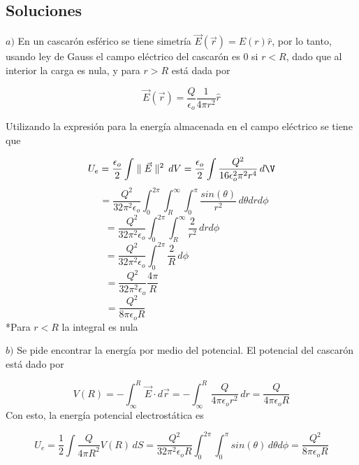 \subsection{Soluciones}

\newline\newline
$a)$ En un cascarón esférico se tiene simetría $\Vec{E}(\Vec{r}) = E(r)\hat{r}$, por lo tanto, usando ley de Gauss el campo eléctrico del cascarón es 0 si $r<R$, dado que al interior la carga es nula, y para $r>R$ está dada por

\[\Vec{E}(\Vec{r})=\frac{Q}{\epsilon_o}\frac{1}{4\pi r^2}\hat{r}\]

Utilizando la expresión para la energía almacenada en el campo eléctrico se tiene que

\[U_e = \frac{\epsilon_o}{2}\int \parallel\Vec{E}\parallel^2\, dV
= \frac{\epsilon_o}{2}\int \frac{Q^2}{16\epsilon_o^2\pi^2 r^4} \, d\V
\]
\[\,\,\,
= \frac{Q^2}{32\pi^2\epsilon_o}\int^{2\pi}_0\int^{\infty}_R\int^\pi_0 \frac{sin(\theta)}{r^2} \, d\theta drd\phi
\]
\[
= \frac{Q^2}{32\pi^2\epsilon_o}\int^{2\pi}_0\int^{\infty}_R \frac{2}{r^2} \, drd\phi
\,\,\,\,\,\,\,\,\,\,\,\,\,\,\,\,\,\,\,\,\,\,\,\,\]
\[
= \frac{Q^2}{32\pi^2\epsilon_o}\int^{2\pi}_0\frac{2}{R}\, d\phi
\,\,\,\,\,\,\,\,\,\,\,\,\,\,\,\,\,\,\,\,\,\,\,\,\,\,\,\,\,\,\,\,\,\,\,\,\,\,\,\,\,\,\,\]
\[
= \frac{Q^2}{32\pi^2\epsilon_o}\frac{4\pi}{R}
\,\,\,\,\,\,\,\,\,\,\,\,\,\,\,\,\,\,\,\,\,\,\,\,\,\,\,\,\,\,\,\,\,\,\,\,\,\,\,\,\,\,\,\,\,\,\,\,\,\,\,\,\,\,\,\,\,\,\,\,\,\]
\[
= \frac{Q^2}{8\pi\epsilon_oR}\,\,\,
\,\,\,\,\,\,\,\,\,\,\,\,\,\,\,\,\,\,\,\,\,\,\,\,\,\,\,\,\,\,\,\,\,\,\,\,\,\,\,\,\,\,\,\,\,\,\,\,\,\,\,\,\,\,\,\,\,\,\,\,\,\,\,\,\,\,\]
\medbreak
*Para $r<R$ la integral es nula
\bigbreak

$b)$ Se pide encontrar la energía por medio del potencial.
\medbreak
El potencial del cascarón está dado por

\[V(R) = -\int^R_\infty\Vec{E}\cdot d\Vec{r}
= -\int^R_\infty\frac{Q}{4\pi\epsilon_o r^2}\,dr
= \frac{Q}{4\pi\epsilon_o R}\]
\medbreak
Con esto, la energía potencial electrostática es

\[U_e = \frac{1}{2}\int\frac{Q}{4\pi R^2}V(R)\,dS
= \frac{Q^2}{32\pi^2\epsilon_o R}\int^{2\pi}_0\int^\pi_0sin(\theta)\,d\theta d\phi
= \frac{Q^2}{8\pi\epsilon_oR}\]


\newpage